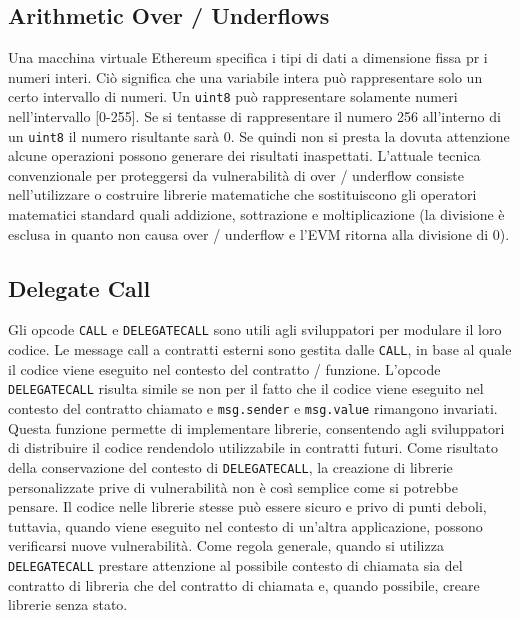\subsection*{Arithmetic Over / Underflows}
Una macchina virtuale Ethereum specifica i tipi di dati a dimensione fissa pr i numeri interi. Ciò significa che una variabile intera può rappresentare solo un certo intervallo di numeri. Un \lstinline|uint8| può rappresentare solamente numeri nell'intervallo [0-255]. Se si tentasse di rappresentare il numero 256 all'interno di un \lstinline|uint8| il numero risultante sarà 0. Se quindi non si presta la dovuta attenzione alcune operazioni possono generare dei risultati inaspettati. L'attuale tecnica convenzionale per proteggersi da vulnerabilità di over / underflow consiste nell'utilizzare o costruire librerie matematiche che sostituiscono gli operatori matematici standard quali addizione, sottrazione e moltiplicazione (la divisione è esclusa in quanto non causa over / underflow e l'EVM ritorna alla divisione di 0).

\subsection*{Delegate Call}
Gli opcode \lstinline|CALL| e \lstinline|DELEGATECALL| sono utili agli sviluppatori per modulare il loro codice. Le message call a contratti esterni sono gestita dalle \lstinline|CALL|, in base al quale il codice viene eseguito nel contesto del contratto / funzione. L'opcode \lstinline|DELEGATECALL| risulta simile se non per il fatto che il codice viene eseguito nel contesto del contratto chiamato e \lstinline|msg.sender| e \lstinline|msg.value| rimangono invariati. Questa funzione permette di implementare librerie, consentendo agli sviluppatori di distribuire il codice rendendolo utilizzabile in contratti futuri. Come risultato della conservazione del contesto di \lstinline|DELEGATECALL|, la creazione di librerie personalizzate prive di vulnerabilità non è così semplice come si potrebbe pensare. Il codice nelle librerie stesse può essere sicuro e privo di punti deboli, tuttavia, quando viene eseguito nel contesto di un'altra applicazione, possono verificarsi nuove vulnerabilità. Come regola generale, quando si utilizza \lstinline|DELEGATECALL| prestare attenzione al possibile contesto di chiamata sia del contratto di libreria che del contratto di chiamata e, quando possibile, creare librerie senza stato.


